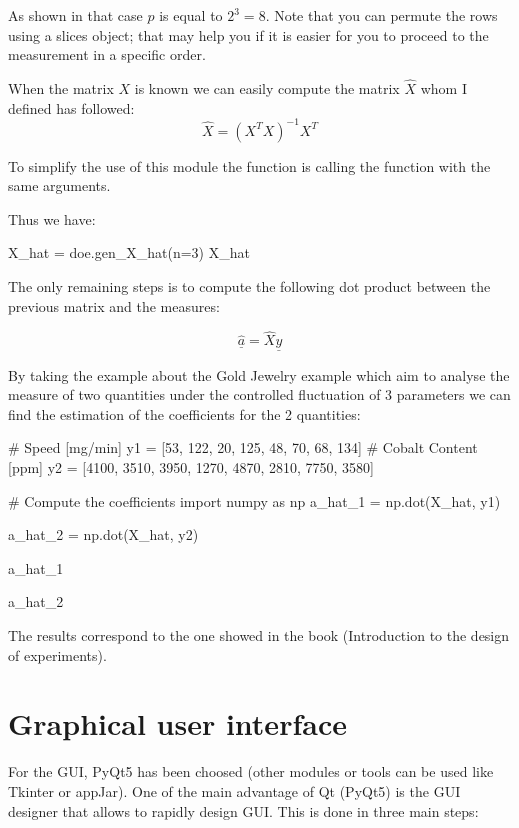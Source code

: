 \documentclass[english, 12 pt, openany, oneside]{book}
\begin{document}
As shown in that case $p$ is equal to $2^3=8$. Note that you can permute the rows using a slices object; that may help you if it is easier for you to proceed to the measurement in a specific order.

When the matrix $X$ is known we can easily compute the matrix $\hat{X}$ whom I defined has followed:
\begin{equation*}
\hat{X} = \left(X^T X\right)^{-1} X^T
\end{equation*}

To simplify the use of this module the function  is calling the function  with the same arguments.

Thus we have:
\begin{pyconsole}[][breaklines]
X_hat  = doe.gen_X_hat(n=3)
X_hat
\end{pyconsole}

The only remaining steps is to compute the following dot product between the previous matrix and the measures:

\begin{equation*}
\hat{\underline{a}} = \hat{X} \underline{y}
\end{equation*}

By taking the example about the Gold Jewelry example which aim to analyse the measure of two quantities under the controlled fluctuation of 3 parameters we can find the estimation of the coefficients for the 2 quantities:

\begin{pyconsole}[][breaklines]
# Speed [mg/min]
y1 = [53, 122, 20, 125, 48, 70, 68, 134]
# Cobalt Content [ppm]
y2 = [4100, 3510, 3950, 1270, 4870, 2810, 7750, 3580]

# Compute the coefficients
import numpy as np
a_hat_1 = np.dot(X_hat, y1)

a_hat_2 = np.dot(X_hat, y2)

a_hat_1

a_hat_2
\end{pyconsole}

The results correspond to the one showed in the book (Introduction to the design of experiments).

\section{Graphical user interface}
For the GUI, PyQt5 has been choosed (other modules or tools can be used like Tkinter or appJar). One of the main advantage of Qt (PyQt5) is the GUI designer that allows to rapidly design GUI. This is done in three main steps:
\end{document}
